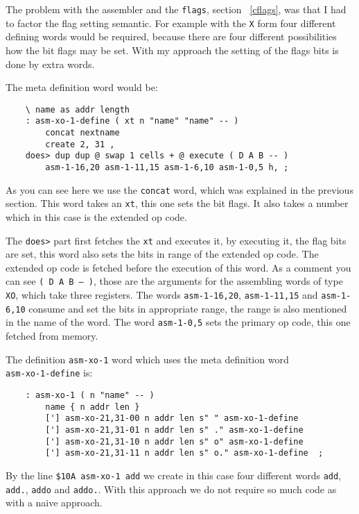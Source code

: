     The problem with the assembler and the \texttt{flags}, section
    ~\ref{cflags}, was that I had to factor the flag setting semantic. For 
    example with the \texttt{X} form four different defining words would 
    be required, because there are four different possibilities how the bit 
    flags may be set.  With my approach the setting of the flags bits is done 
    by extra words.

    The meta definition word would be:

    \begin{verbatim}
    \ name as addr length
    : asm-xo-1-define ( xt n "name" "name" -- ) 
        concat nextname
        create 2, 31 ,
    does> dup dup @ swap 1 cells + @ execute ( D A B -- )
        asm-1-16,20 asm-1-11,15 asm-1-6,10 asm-1-0,5 h, ;
    \end{verbatim}

    As you can see here we use the \texttt{concat} word, which was explained
    in the previous section. This word takes an \texttt{xt}, this one sets the
    bit flags. It also takes a number which in this case is the extended op code.

    The \texttt{does>} part first fetches the \texttt{xt} and executes it, by
    executing it, the flag bits are set, this word also sets the bits in range
    of the extended op code. The extended op code is fetched before the 
    execution of this word. As a comment you can see \texttt{( D A B -- )}, 
    those are the arguments for the assembling words of type \texttt{XO}, which 
    take three registers. The words \texttt{asm-1-16,20}, \texttt{asm-1-11,15} 
    and \texttt{asm-1-6,10} consume and set the bits in appropriate range, the 
    range is also mentioned in the name of the word. The word 
    \texttt{asm-1-0,5} sets the primary op code, this one fetched from memory.
    
    The definition \texttt{asm-xo-1} word which uses the  
    meta definition word \\\texttt{asm-xo-1-define} is:

    \begin{verbatim}
    : asm-xo-1 ( n "name" -- )
        name { n addr len }
        ['] asm-xo-21,31-00 n addr len s" " asm-xo-1-define
        ['] asm-xo-21,31-01 n addr len s" ." asm-xo-1-define
        ['] asm-xo-21,31-10 n addr len s" o" asm-xo-1-define
        ['] asm-xo-21,31-11 n addr len s" o." asm-xo-1-define  ;
    \end{verbatim}

    By the line \texttt{\$10A asm-xo-1 add} we create in this case four
    different words \texttt{add}, \texttt{add.}, \texttt{addo} and
    \texttt{addo.}. With this approach we do not require so much code as with 
    a naive approach.

